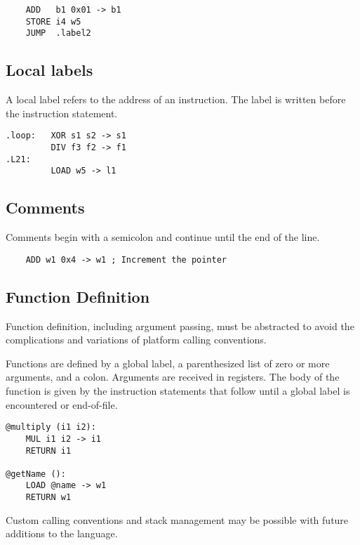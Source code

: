 \begin{verbatim}
    ADD   b1 0x01 -> b1
    STORE i4 w5
    JUMP  .label2
\end{verbatim}

\subsection{Local labels}

A local label refers to the address of an instruction.
The label is written before the instruction statement.

\begin{verbatim}
.loop:   XOR s1 s2 -> s1
         DIV f3 f2 -> f1
.L21:
         LOAD w5 -> l1
\end{verbatim}

\subsection{Comments}

Comments begin with a semicolon and continue until the end of the line.

\begin{verbatim}
    ADD w1 0x4 -> w1 ; Increment the pointer
\end{verbatim}

\subsection{Function Definition}

Function definition, including argument passing, must be abstracted to avoid
the complications and variations of platform calling conventions.

Functions are defined by a global label, a parenthesized list of zero
or more arguments, and a colon. Arguments are received in registers.
The body of the function is given by the instruction statements that follow
until a global label is encountered or end-of-file.

\begin{verbatim}
@multiply (i1 i2):
    MUL i1 i2 -> i1
    RETURN i1

@getName ():
    LOAD @name -> w1
    RETURN w1
\end{verbatim}

Custom calling conventions and stack management may
be possible with future additions to the language.
